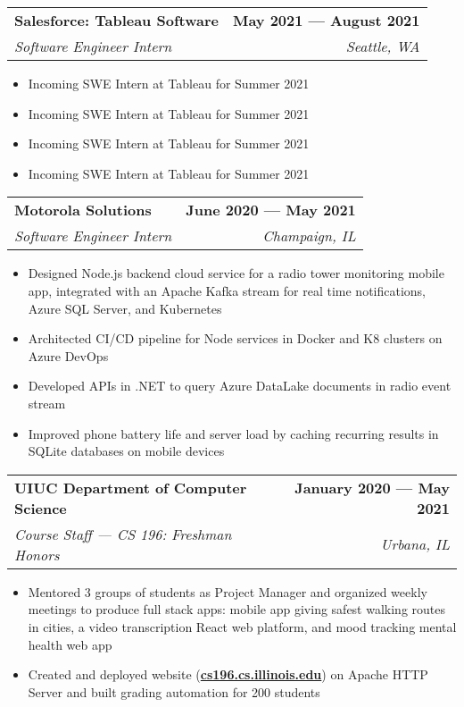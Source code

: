 \documentclass[letterpaper,10pt]{article}
\makeatletter
\newcommand{\resumeItem}[1]{
  \item\small{
    {#1 \vspace{-2pt}}
  }
}
\newcommand{\resumeSubheading}[4]{
  \vspace{-2pt}
  \item
    \begin{tabular*}{1\textwidth}[t]{l@{\extracolsep{\fill}}r}
      \large{\textbf{#1}} & \small{\color{main}\textbf{#2}} \\
      \textit{\small#3} & \textit{\small#4} \\
    \end{tabular*}\vspace{-7pt}
}
\newcommand{\resumeSubSubheading}[2]{
    \item
    \begin{tabular*}{0.97\textwidth}{l@{\extracolsep{\fill}}r}
      \textit{\small#1} & \textit{\small #2} \\
    \end{tabular*}\vspace{-7pt}
}
\newcommand{\resumeSubHeadingListEnd}{\end{itemize}}
\newcommand{\resumeItemListStart}{\begin{itemize}}
\newcommand{\resumeItemListEnd}{\end{itemize}\vspace{0pt}}
\makeatother
\begin{document}
    \resumeSubheading
      {Salesforce: Tableau Software} %
      {May 2021 --- August 2021} %
      {Software Engineer Intern} %
      {Seattle, WA} %
      \resumeItemListStart
        \resumeItem{Incoming SWE Intern at Tableau for Summer 2021}
        \resumeItem{Incoming SWE Intern at Tableau for Summer 2021}
        \resumeItem{Incoming SWE Intern at Tableau for Summer 2021}
        \resumeItem{Incoming SWE Intern at Tableau for Summer 2021}
      \resumeItemListEnd
      

    \resumeSubheading
      {Motorola Solutions} %
      {June 2020 --- May 2021} %
      {Software Engineer Intern} %
      {Champaign, IL} %
      \resumeItemListStart
        \resumeItem{Designed Node.js backend cloud service for a radio tower monitoring mobile app, integrated with an Apache Kafka stream for real time notifications, Azure SQL Server, and Kubernetes }
        \resumeItem{Architected CI/CD pipeline for Node services in Docker and K8 clusters on Azure DevOps}
        \resumeItem{Developed APIs in .NET to query Azure DataLake documents in radio event stream}
        \resumeItem{Improved phone battery life and server load by caching recurring results in SQLite databases on mobile devices}
    \resumeItemListEnd

    \resumeSubheading
      {UIUC Department of Computer Science} %
      {January 2020 --- May 2021} %
      {Course Staff --- CS 196: Freshman Honors} %
      {Urbana, IL} %
      \resumeItemListStart
        \resumeItem{Mentored 3 groups of students as Project Manager and organized weekly meetings to produce full stack apps: mobile app giving safest walking routes in cities, a video transcription React web platform, and mood tracking mental health web app}

        \resumeItem{Created and deployed website (\textbf{\href{https://cs196.cs.illinois.edu}{cs196.cs.illinois.edu}}) on Apache HTTP Server and built grading automation for 200 students}
      \resumeItemListEnd
\end{document}
